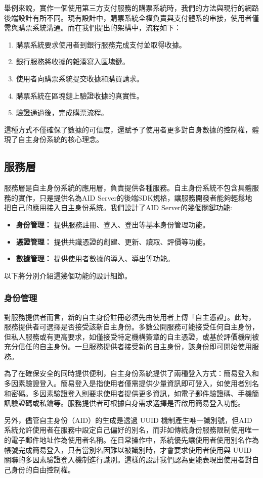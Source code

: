 舉例來說，實作一個使用第三方支付服務的購票系統時，我們的方法與現行的網路後端設計有所不同。現有設計中，購票系統全權負責與支付體系的串接，使用者僅需與購票系統溝通。而在我們提出的架構中，流程如下：
\begin{enumerate}
  \item 購票系統要求使用者到銀行服務完成支付並取得收據。
  \item 銀行服務將收據的雜湊寫入區塊鏈。
  \item 使用者向購票系統提交收據和購買請求。
  \item 購票系統在區塊鏈上驗證收據的真實性。
  \item 驗證通過後，完成購票流程。
\end{enumerate}
這種方式不僅確保了數據的可信度，還賦予了使用者更多對自身數據的控制權，體現了自主身份系統的核心理念。
\subsection{服務層}
服務層是自主身份系統的應用層，負責提供各種服務。自主身份系統不包含具體服務的實作，只是提供名為AID Server的後端SDK規格，讓服務開發者能夠輕鬆地把自己的應用接入自主身份系統。我們設計了AID Server的幾個關鍵功能:
\begin{itemize}
  \item \textbf{身份管理：} 提供服務註冊、登入、登出等基本身份管理功能。
  \item \textbf{憑證管理：} 提供共識憑證的創建、更新、讀取、評價等功能。
  \item \textbf{數據管理：} 提供使用者數據的導入、導出等功能。
\end{itemize}
以下將分別介紹這幾個功能的設計細節。
\subsubsection{身份管理}
對服務提供者而言，新的自主身份註冊必須先由使用者上傳「自主憑證」。此時，服務提供者可選擇是否接受該新自主身份。多數公開服務可能接受任何自主身份，但私人服務或有更高要求，如僅接受特定機構簽章的自主憑證，或基於評價機制被充分信任的自主身份。一旦服務提供者接受新的自主身份，該身份即可開始使用服務。

為了在確保安全的同時提供便利，自主身份系統提供了兩種登入方式：簡易登入和多因素驗證登入。簡易登入是指使用者僅需提供少量資訊即可登入，如使用者別名和密碼。多因素驗證登入則要求使用者提供更多資訊，如電子郵件驗證碼、手機簡訊驗證碼或私鑰等。服務提供者可根據自身需求選擇是否啟用簡易登入功能。

另外，儘管自主身份（AID）的生成是透過 UUID 機制\cite{uuid}產生唯一識別號，但AID系統允許使用者在服務中設定自己偏好的別名，而非如傳統身份服務限制使用唯一的電子郵件地址作為使用者名稱。在日常操作中，系統優先讓使用者使用別名作為帳號完成簡易登入，只有當別名因難以被識別時，才會要求使用者使用與 UUID 關聯的多因素驗證登入機制進行識別。這樣的設計我們認為更能表現出使用者對自己身份的自由控制權。

